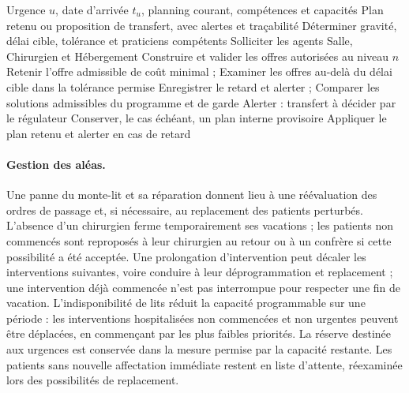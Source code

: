 \documentclass[11pt,a4paper]{article}
\begin{document}
\begin{algorithm}[htbp]
\caption{Schéma de la régulation d'une urgence par négociation et escalade}
\label{alg:cnp}
\begin{algorithmic}[1]
\Require Urgence $u$, date d'arrivée $t_u$, planning courant, compétences et capacités
\Ensure Plan retenu ou proposition de transfert, avec alertes et traçabilité
\State Déterminer gravité, délai cible, tolérance et praticiens compétents
    \State Solliciter les agents Salle, Chirurgien et Hébergement
    \State Construire et valider les offres autorisées au niveau $n$
        \State Retenir l'offre admissible de coût minimal ; \Return
    \EndIf
\EndFor
\State Examiner les offres au-delà du délai cible dans la tolérance permise
    \State Enregistrer le retard et alerter ; \Return
\EndIf
\State Comparer les solutions admissibles du programme et de garde
    \State Alerter : transfert à décider par le régulateur
    \State Conserver, le cas échéant, un plan interne provisoire
\Else
    \State Appliquer le plan retenu et alerter en cas de retard
\EndIf
\end{algorithmic}
\end{algorithm}

\paragraph{Gestion des aléas.}
Une panne du monte-lit et sa réparation donnent lieu à une réévaluation des ordres de passage et, si nécessaire, au replacement des patients perturbés. L'absence d'un chirurgien ferme temporairement ses vacations ; les patients non commencés sont reproposés à leur chirurgien au retour ou à un confrère si cette possibilité a été acceptée. Une prolongation d'intervention peut décaler les interventions suivantes, voire conduire à leur déprogrammation et replacement ; une intervention déjà commencée n'est pas interrompue pour respecter une fin de vacation. L'indisponibilité de lits réduit la capacité programmable sur une période : les interventions hospitalisées non commencées et non urgentes peuvent être déplacées, en commençant par les plus faibles priorités. La réserve destinée aux urgences est conservée dans la mesure permise par la capacité restante. Les patients sans nouvelle affectation immédiate restent en liste d'attente, réexaminée lors des possibilités de replacement.
\end{document}
